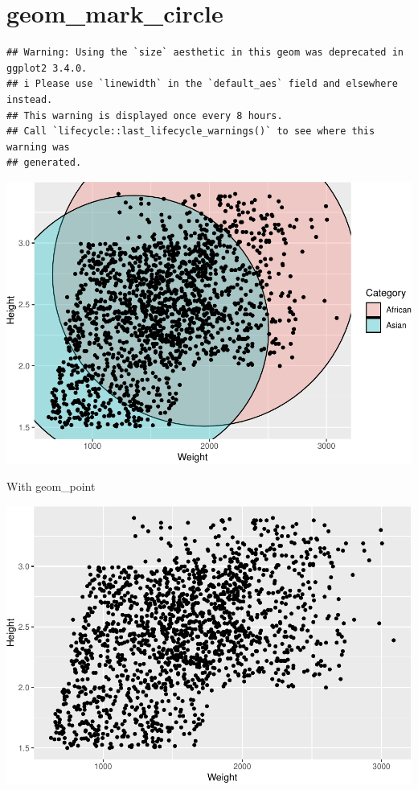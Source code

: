 \documentclass[
]{book}
\begin{document}
\hypertarget{geom_mark_circle}{%
\section{geom\_mark\_circle}\label{geom_mark_circle}}

\begin{verbatim}
## Warning: Using the `size` aesthetic in this geom was deprecated in ggplot2 3.4.0.
## i Please use `linewidth` in the `default_aes` field and elsewhere instead.
## This warning is displayed once every 8 hours.
## Call `lifecycle::last_lifecycle_warnings()` to see where this warning was
## generated.
\end{verbatim}

\includegraphics{Data-Visualisation-geom-Encyclopedia_files/figure-latex/unnamed-chunk-44-1.pdf}

With geom\_point

\includegraphics{Data-Visualisation-geom-Encyclopedia_files/figure-latex/unnamed-chunk-45-1.pdf}
\end{document}
